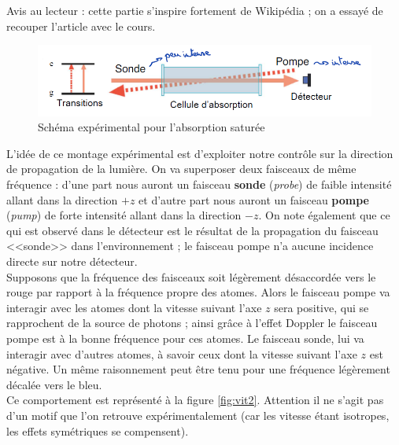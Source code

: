Avis au lecteur : cette partie s'inspire fortement de Wikipédia ; on a essayé de recouper l'article avec le cours.\\
\begin{figure}[tph]
    \centering
    \includegraphics[width=\textwidth]{Images2/AbsoSatu.PNG}
    \caption{Schéma expérimental pour l'absorption saturée}
\label{fig:absoSatu}
\end{figure}
L'idée de ce montage expérimental est d'exploiter notre contrôle sur la direction de propagation de la lumière. On va superposer deux faisceaux de même fréquence : d'une part nous auront un faisceau \textbf{sonde} (\textit{probe}) de faible intensité allant dans la direction $+z$ et d'autre part nous auront un faisceau \textbf{pompe} (\textit{pump}) de forte intensité allant dans la direction $-z$. On note également que ce qui est observé dans le détecteur est le résultat de la propagation du faisceau <<sonde>> dans l'environnement ; le faisceau pompe n'a aucune incidence directe sur notre détecteur.\\

Supposons que la fréquence des faisceaux soit légèrement désaccordée vers le rouge par rapport à la fréquence propre des atomes. Alors le faisceau pompe va interagir avec les atomes dont la vitesse suivant l'axe $z$ sera positive, qui se rapprochent de la source de photons ; ainsi grâce à l'effet Doppler le faisceau pompe est à la bonne fréquence pour ces atomes. Le faisceau sonde, lui va interagir avec d'autres atomes, à savoir ceux dont la vitesse suivant l'axe $z$ est négative. Un même raisonnement peut être tenu pour une fréquence légèrement décalée vers le bleu.\\
Ce comportement est représenté à la figure \ref{fig:vit2}. Attention il ne s'agit pas d'un motif que l'on retrouve expérimentalement (car les vitesse étant isotropes, les effets symétriques se compensent).\\

